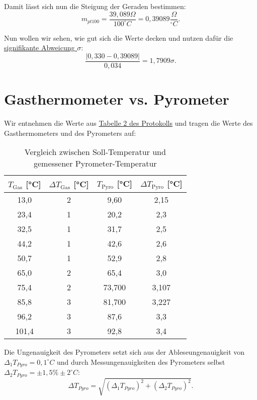 Damit lässt sich nun die Steigung der Geraden bestimmen:
\begin{equation}
    m_{pt100} = \frac{39,089\Omega}{100^\circ C} = 0,39089 \frac{\Omega}{^\circ C}.
\end{equation}

Nun wollen wir sehen, wie gut sich die Werte decken und nutzen dafür die \hyperref[eq:signifikante_abweichung]{signifikante Abweicung $\sigma$}:
\begin{equation}
    \frac{\left| 0,330 - 0,39089 \right|}{0,034} = 1,7909\sigma.
\end{equation}


\section{Gasthermometer vs. Pyrometer}
Wir entnehmen die Werte aus \hyperref[Protokoll]{Tabelle 2 des Protokolls} und tragen die Werte des Gasthermometers und des Pyrometers auf:

\begin{table}[h!]
    \centering
    \caption{Vergleich zwischen Soll-Temperatur und gemessener Pyrometer-Temperatur}
    \label{tab:ziel_pyrometer}
    \begin{tabular}{c | c | c | c}
        \toprule
        $T_\mathrm{Gas}$ [°C] & $\Delta T_\mathrm{Gas}$ [°C] & $T_\mathrm{Pyro}$ [°C] & $\Delta T_\mathrm{Pyro}$ [°C] \\ 
        \midrule
        13,0  & 2 & 9,60   & 2,15  \\
        23,4  & 1 & 20,2   & 2,3   \\
        32,5  & 1 & 31,7   & 2,5   \\
        44,2  & 1 & 42,6   & 2,6   \\
        50,7  & 1 & 52,9   & 2,8   \\
        65,0  & 2 & 65,4   & 3,0   \\
        75,4  & 2 & 73,700 & 3,107 \\
        85,8  & 3 & 81,700 & 3,227 \\
        96,2  & 3 & 87,6   & 3,3   \\
        101,4 & 3 & 92,8   & 3,4   \\
        \bottomrule
    \end{tabular}
\end{table}


Die Ungenauigkeit des Pyrometers setzt sich aus der Ableseungenauigkeit von $\Delta_1 T_{Pyro} = 0,1 ^\circ C$ und durch Messungenauigkeiten des Pyrometers selbst $\Delta_2 T_{Pyro} = \pm 1,5\% \pm 2^\circ C$:
\begin{equation}
    \Delta T_{Pyro} = \sqrt{(\Delta_1 T_{Pyro})^2 + (\Delta_2 T_{Pyro})^2}.
\end{equation}


